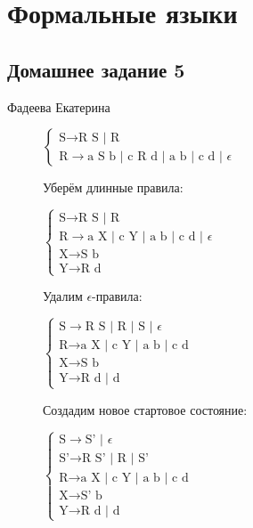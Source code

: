 \documentclass[12pt,a4paper]{scrartcl}
\begin{document}
	\section*{Формальные языки}
	\subsection*{Домашнее задание 5}
	\begin{flushright}
		Фадеева Екатерина
	\end{flushright}

\begin{description}
	\item[]
	$\begin{cases}
	\text{S} \rightarrow \text{R S | R}\\
	\text{R} \rightarrow \text{a S b | c R d | a b | c d | } \epsilon
	\end{cases}$
	
	Уберём длинные правила:
	
	$\begin{cases}
	\text{S} \rightarrow \text{R S | R}\\
	\text{R} \rightarrow \text{a X | c Y | a b | c d | } \epsilon\\
	\text{X} \rightarrow \text{S b}\\
	\text{Y} \rightarrow \text{R d}
	\end{cases}$
	
	Удалим $\epsilon$-правила:
	
	$\begin{cases}
	\text{S} \rightarrow \text{R S | R | S | } \epsilon\\
	\text{R} \rightarrow \text{a X | c Y | a b | c d}\\
	\text{X} \rightarrow \text{S b}\\
	\text{Y} \rightarrow \text{R d | d}
	\end{cases}$
	
	Создадим новое стартовое состояние:
	
	$\begin{cases}
	\text{S} \rightarrow \text{S' | } \epsilon\\
	\text{S'} \rightarrow \text{R S' | R | S' } \\
	\text{R} \rightarrow \text{a X | c Y | a b | c d}\\
	\text{X} \rightarrow \text{S' b}\\
	\text{Y} \rightarrow \text{R d | d}
	\end{cases}$
	

\end{description}
\end{document}
